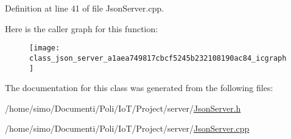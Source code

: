 Definition at line 41 of file Json\+Server.\+cpp.



Here is the caller graph for this function\+:\nopagebreak
\begin{figure}[H]
\begin{center}
\leavevmode
\texttt{[image: class\_json\_server\_a1aea749817cbcf5245b232108190ac84\_icgraph]}
\end{center}
\end{figure}




The documentation for this class was generated from the following files\+:\begin{DoxyCompactItemize}
\item 
/home/simo/\+Documenti/\+Poli/\+Io\+T/\+Project/server/\hyperlink{_json_server_8h}{Json\+Server.\+h}\item 
/home/simo/\+Documenti/\+Poli/\+Io\+T/\+Project/server/\hyperlink{_json_server_8cpp}{Json\+Server.\+cpp}\end{DoxyCompactItemize}
